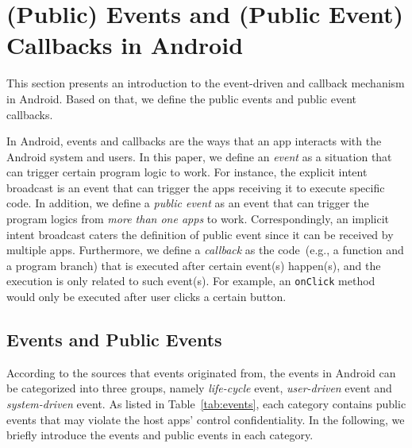 \section{(Public) Events and (Public Event) Callbacks in Android}
This section presents an introduction to the event-driven and callback mechanism in Android. 
Based on that, we define the public events and public event callbacks. 


In Android, events and callbacks are the ways that an app interacts with the Android system and users. 
In this paper, we define an \textit{event} as a situation that can trigger certain program logic to work. 
For instance, the explicit intent broadcast is an event that can trigger the apps receiving it to execute specific code.
In addition, we define a \textit{public event} as an event that can trigger the 
program logics from \emph{more than one apps} to work. 
Correspondingly, an implicit intent broadcast caters the definition of public event since it can be received by multiple apps. 
Furthermore, we define a \textit{callback} as the code~(e.g., a function and a program branch) that is executed after certain event(s) happen(s), 
and the execution is only related to such event(s). For example, an \texttt{onClick} method would only be executed after user clicks a certain button. 

\subsection{Events and Public Events}

According to the sources that events originated from, the events in Android can be categorized into three groups, 
namely \emph{life-cycle} event, \emph{user-driven} event and \emph{system-driven} event. 
As listed in Table~\ref{tab:events}, each category contains public events that may violate the host apps' control confidentiality. 
In the following, we briefly introduce the events and public events in each category. 

